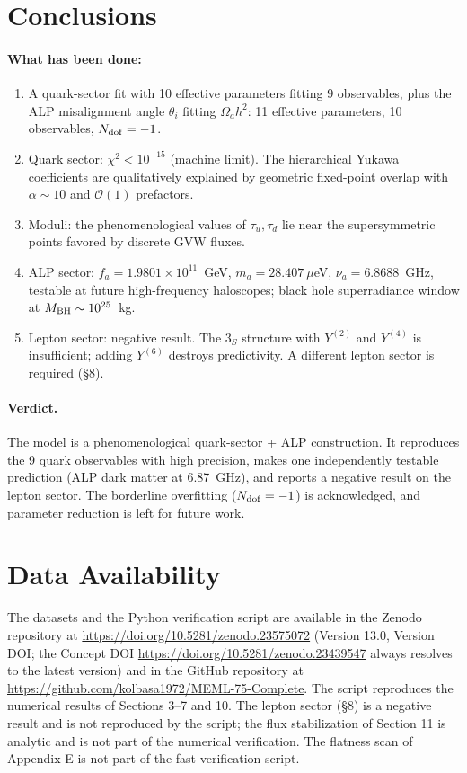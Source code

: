 \documentclass[12pt,a4paper]{article}
\numberwithin{equation}{section}
\begin{document}
\section{Conclusions}
\paragraph{What has been done:}
\begin{enumerate}[leftmargin=1.5em]
\item A quark-sector fit with 10 effective parameters fitting 9 observables, plus the ALP misalignment angle \(\theta_i\) fitting \(\Omega_a h^2\): 11 effective parameters, 10 observables, \(N_{\rm dof} = -1\).
\item Quark sector: \(\chi^2 < 10^{-15}\) (machine limit). The hierarchical Yukawa coefficients are qualitatively explained by geometric fixed-point overlap with \(\alpha \sim 10\) and \(\mathcal{O}(1)\) prefactors.
\item Moduli: the phenomenological values of \(\tau_u, \tau_d\) lie near the supersymmetric points favored by discrete GVW fluxes.
\item ALP sector: \(f_a = 1.9801 \times 10^{11}\)~GeV, \(m_a = 28.407~\mu\)eV, \(\nu_a = 6.8688\)~GHz, testable at future high-frequency haloscopes; black hole superradiance window at \(M_{\rm BH} \sim 10^{25}\)~kg.
\item Lepton sector: negative result. The \(3_S\) structure with \(Y^{(2)}\) and \(Y^{(4)}\) is insufficient; adding \(Y^{(6)}\) destroys predictivity. A different lepton sector is required (\S8).
\end{enumerate}
\paragraph{Verdict.} The model is a phenomenological quark-sector + ALP construction. It reproduces the 9 quark observables with high precision, makes one independently testable prediction (ALP dark matter at 6.87~GHz), and reports a negative result on the lepton sector. The borderline overfitting (\(N_{\rm dof} = -1\)) is acknowledged, and parameter reduction is left for future work.

\section*{Data Availability}
The datasets and the Python verification script are available in the Zenodo repository at \url{https://doi.org/10.5281/zenodo.23575072} (Version 13.0, Version DOI; the Concept DOI \url{https://doi.org/10.5281/zenodo.23439547} always resolves to the latest version) and in the GitHub repository at \url{https://github.com/kolbasa1972/MEML-75-Complete}. The script reproduces the numerical results of Sections 3--7 and 10. The lepton sector (\S8) is a negative result and is not reproduced by the script; the flux stabilization of Section 11 is analytic and is not part of the numerical verification. The flatness scan of Appendix E is not part of the fast verification script.
\end{document}

